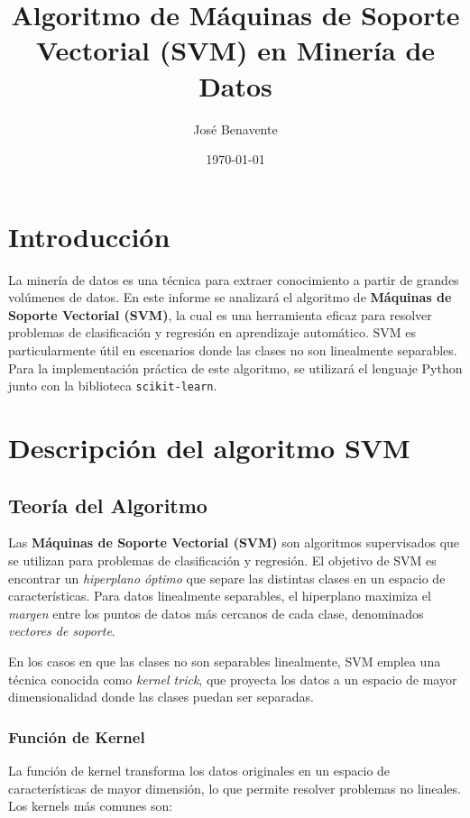 \documentclass[a4paper,12pt]{article}
\title{Algoritmo de Máquinas de Soporte Vectorial (SVM) en Minería de Datos}
\author{José Benavente}
\date{\today}
\begin{document}
\maketitle

\newpage

\tableofcontents

\newpage

\section{Introducción}
La minería de datos es una técnica para extraer conocimiento a partir de grandes volúmenes de datos. En este informe se analizará el algoritmo de \textbf{Máquinas de Soporte Vectorial (SVM)}, la cual es una herramienta eficaz para resolver problemas de clasificación y regresión en aprendizaje automático. SVM es particularmente útil en escenarios donde las clases no son linealmente separables. Para la implementación práctica de este algoritmo, se utilizará el lenguaje Python junto con la biblioteca \texttt{scikit-learn}.

\section{Descripción del algoritmo SVM}
\subsection{Teoría del Algoritmo}

Las \textbf{Máquinas de Soporte Vectorial (SVM)} son algoritmos supervisados que se utilizan para problemas de clasificación y regresión. El objetivo de SVM es encontrar un \textit{hiperplano óptimo} que separe las distintas clases en un espacio de características. Para datos linealmente separables, el hiperplano maximiza el \textit{margen} entre los puntos de datos más cercanos de cada clase, denominados \textit{vectores de soporte}.

En los casos en que las clases no son separables linealmente, SVM emplea una técnica conocida como \textit{kernel trick}, que proyecta los datos a un espacio de mayor dimensionalidad donde las clases puedan ser separadas.

\pagebreak

\subsubsection{Función de Kernel}
La función de kernel transforma los datos originales en un espacio de características de mayor dimensión, lo que permite resolver problemas no lineales. Los kernels más comunes son:
\end{document}
